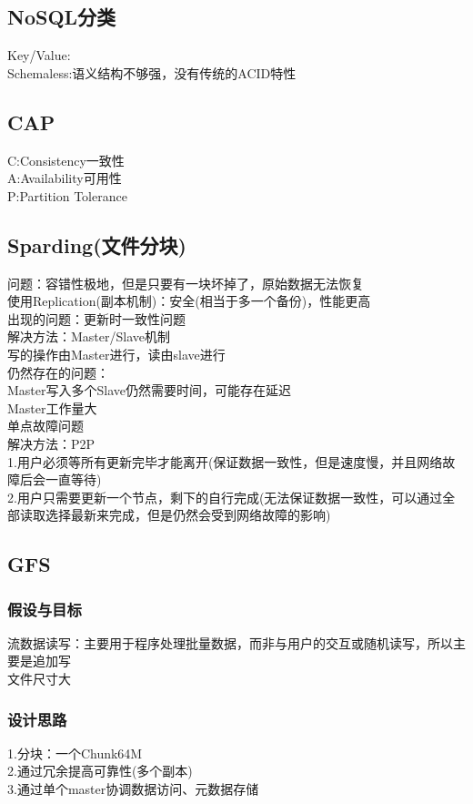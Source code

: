 \documentclass{article}
\begin{document}
\begin{CJK}{UTF8}{gbsn}
	\subsection*{NoSQL分类}
	Key/Value:\\
	Schemaless:语义结构不够强，没有传统的ACID特性\\
	
	\subsection*{CAP}
	C:Consistency一致性\\
	A:Availability可用性\\
	P:Partition Tolerance\\
	\subsection*{Sparding(文件分块)}
	问题：容错性极地，但是只要有一块坏掉了，原始数据无法恢复\\
	使用Replication(副本机制)：安全(相当于多一个备份)，性能更高\\
	出现的问题：更新时一致性问题\\
	解决方法：Master/Slave机制\\
	写的操作由Master进行，读由slave进行\\
	仍然存在的问题：\\
	Master写入多个Slave仍然需要时间，可能存在延迟\\
	Master工作量大\\
	单点故障问题\\
	解决方法：P2P\\
	1.用户必须等所有更新完毕才能离开(保证数据一致性，但是速度慢，并且网络故障后会一直等待)\\
	2.用户只需要更新一个节点，剩下的自行完成(无法保证数据一致性，可以通过全部读取选择最新来完成，但是仍然会受到网络故障的影响)\\
	
	\subsection*{GFS}
	\subsubsection*{假设与目标}
	流数据读写：主要用于程序处理批量数据，而非与用户的交互或随机读写，所以主要是追加写\\
	文件尺寸大\\
	\subsubsection*{设计思路}
	1.分块：一个Chunk64M\\
	2.通过冗余提高可靠性(多个副本)\\
	3.通过单个master协调数据访问、元数据存储\\

\end{CJK}
\end{document}
